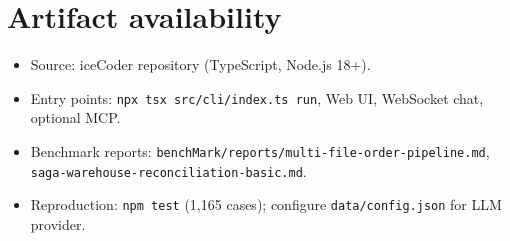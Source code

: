 \documentclass[11pt,a4paper]{article}
\begin{document}
\appendix
\section{Artifact availability}
\label{app:artifacts}

\begin{itemize}[nosep]
  \item Source: iceCoder repository (TypeScript, Node.js 18+).
  \item Entry points: \texttt{npx tsx src/cli/index.ts run}, Web UI, WebSocket chat, optional MCP.
  \item Benchmark reports: \texttt{benchMark/reports/multi-file-order-pipeline.md}, \texttt{saga-warehouse-reconciliation-basic.md}.
  \item Reproduction: \texttt{npm test} (1{,}165 cases); configure \texttt{data/config.json} for LLM provider.
\end{itemize}
\end{document}
